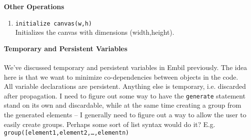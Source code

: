 \documentclass[12pt]{article}
\theoremstyle{remark}
\newcommand{\ttt}[1]{\texttt{#1}}
\begin{document}
\textbf{Other Operations}
\begin{enumerate}
\item \ttt{initialize canvas(w,h)}\\Initializes the canvas with dimensions (width,height).
\end{enumerate}
\textbf{Temporary and Persistent Variables}
\\\\
We've discussed temporary and persistent variables in Embil previously. The idea here is that we want to minimize co-dependencies between objects in the code. All variable declarations are persistent. Anything else is temporary, i.e. discarded after propagation. I need to figure out some way to have the \ttt{generate} statement stand on its own and discardable, while at the same time creating a group from the generated elements -- I generally need to figure out a way to allow the user to easily create groups. Perhaps some sort of list syntax would do it? E.g. \ttt{group([element1,element2,\ldots ,elementn)}
\end{document}
